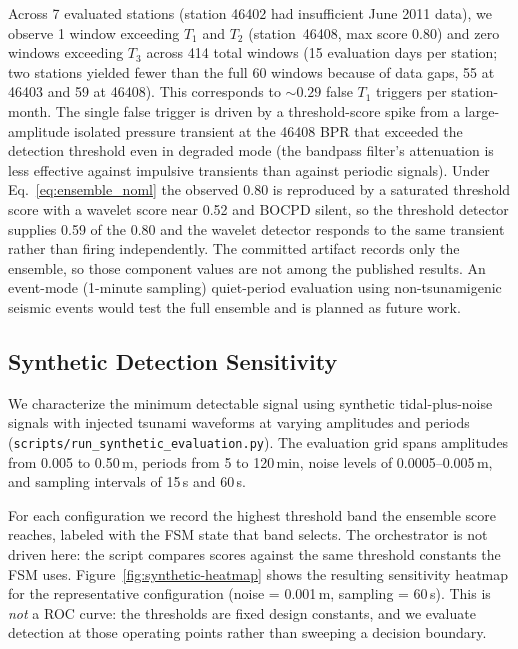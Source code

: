 \documentclass{article}
\begin{document}
Across 7 evaluated stations (station 46402 had insufficient June 2011
data), we observe 1 window exceeding $T_1$ and $T_2$ (station~46408,
max score 0.80) and zero windows exceeding $T_3$ across 414 total
windows (15 evaluation days per station; two stations yielded fewer
than the full 60 windows because of data gaps, 55 at 46403 and 59 at
46408).  This corresponds to
${\sim}0.29$ false $T_1$ triggers per station-month.  The single
false trigger is driven by a threshold-score spike from a
large-amplitude isolated pressure transient at the 46408 BPR that
exceeded the detection threshold even in degraded mode (the bandpass
filter's attenuation is less effective against impulsive transients
than against periodic signals).  Under Eq.~\ref{eq:ensemble_noml} the observed 0.80 is reproduced by a
saturated threshold score with a wavelet score near 0.52 and BOCPD
silent, so the threshold detector supplies 0.59 of the 0.80 and the
wavelet detector responds to the same transient rather than firing
independently.  The committed artifact records only the ensemble, so
those component values are not among the published results.  An event-mode (1-minute sampling)
quiet-period evaluation using non-tsunamigenic seismic events would
test the full ensemble and is planned as future work.

\FloatBarrier
\subsection{Synthetic Detection Sensitivity}
\label{sec:eval-synthetic}

We characterize the minimum detectable signal using synthetic
tidal-plus-noise signals with injected tsunami waveforms at varying
amplitudes and periods
(\texttt{scripts/run\_synthetic\_evaluation.py}).
The evaluation grid spans amplitudes from 0.005 to 0.50\,m,
periods from 5 to 120\,min, noise levels of 0.0005--0.005\,m,
and sampling intervals of 15\,s and 60\,s.

For each configuration we record the highest threshold band the
ensemble score reaches, labeled with the FSM state that band selects.
The orchestrator is not driven here: the script compares scores
against the same threshold constants the FSM uses. Figure~\ref{fig:synthetic-heatmap} shows
the resulting sensitivity heatmap for the representative
configuration (noise = 0.001\,m, sampling = 60\,s).
This is \emph{not} a ROC curve: the thresholds are fixed design
constants, and we evaluate detection at those operating points rather
than sweeping a decision boundary.
\end{document}

